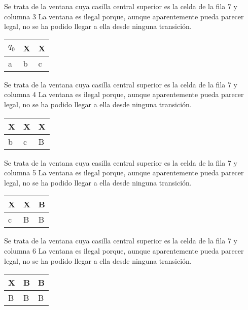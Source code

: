 ﻿\documentclass[a4paper,10pt]{article}
\begin{document}
Se trata de la ventana cuya casilla central superior es la celda de la fila 7 y columna 3\newline
La ventana es ilegal porque, aunque aparentemente pueda parecer legal, no se ha podido llegar a ella desde ninguna transición.\newline
\begin{table}[h!]
\centering
\begin{tabular}{|l|l|l|}
\hline
	$q_0$  &   X   &   X	\\ \hline
	a   &   b   &   c	\\ \hline
\end{tabular}
\end{table}

Se trata de la ventana cuya casilla central superior es la celda de la fila 7 y columna 4\newline
La ventana es ilegal porque, aunque aparentemente pueda parecer legal, no se ha podido llegar a ella desde ninguna transición.\newline
\begin{table}[h!]
\centering
\begin{tabular}{|l|l|l|}
\hline
	X   &   X   &   X	\\ \hline
	b   &   c   &   B	\\ \hline
\end{tabular}
\end{table}

Se trata de la ventana cuya casilla central superior es la celda de la fila 7 y columna 5\newline
La ventana es ilegal porque, aunque aparentemente pueda parecer legal, no se ha podido llegar a ella desde ninguna transición.\newline
\begin{table}[h!]
\centering
\begin{tabular}{|l|l|l|}
\hline
	X   &   X   &   B	\\ \hline
	c   &   B   &   B	\\ \hline
\end{tabular}
\end{table}

Se trata de la ventana cuya casilla central superior es la celda de la fila 7 y columna 6\newline
La ventana es ilegal porque, aunque aparentemente pueda parecer legal, no se ha podido llegar a ella desde ninguna transición.\newline
\begin{table}[h!]
\centering
\begin{tabular}{|l|l|l|}
\hline
	X   &   B   &   B	\\ \hline
	B   &   B   &   B	\\ \hline
\end{tabular}
\end{table}
\end{document}
